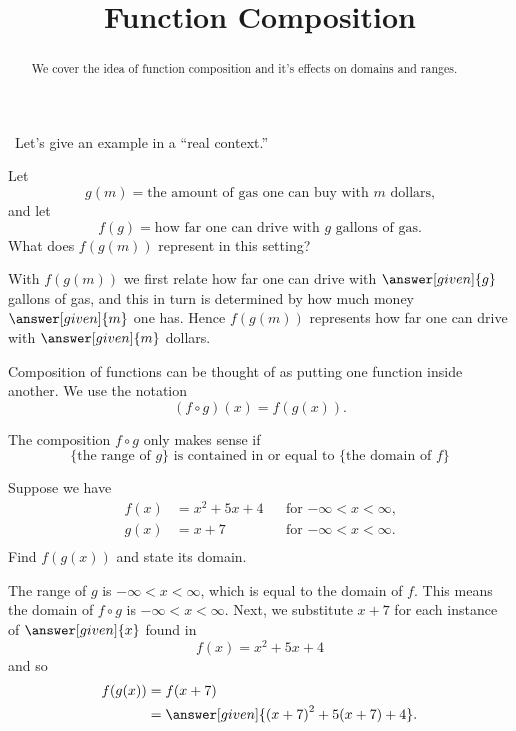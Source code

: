 \documentclass{ximera}
\title{Function Composition}
\begin{document}
\begin{abstract}
    We cover the idea of function composition and it's effects on domains and ranges.
\end{abstract}
\maketitle

\
Let's give an example in a ``real context.''
 
\begin{example}
    Let
    \[
        g(m) = \text{the amount of gas one can buy with $m$ dollars,}
    \]
    and let
    \[
        f(g) = \text{how far one can drive with $g$ gallons of gas.}
    \]
    What does $f(g(m))$ represent in this setting?
    \begin{explanation}
        With $f(g(m))$ we first relate how far one can drive with
        $\answer[given]{g}$ gallons of gas, and this in turn is determined
        by how much money $\answer[given]{m}$ one has. Hence $f(g(m))$ represents how far
        one can drive with $\answer[given]{m}$ dollars.
    \end{explanation}
\end{example}
 
Composition of functions can be thought of as putting one function
inside another.  We use the notation
\[
    (f\circ g)(x) = f(g(x)).
\]
\begin{warning}
    The composition $f\circ g$ only makes sense if
    \[
        \{\text{the range of $g$}\}
        \text{ is contained in or equal to }
        \{\text{the domain of $f$}\}
    \]
\end{warning}
 
\begin{example}
    Suppose we have
    \begin{align*}
        f(x)&={{x}^{2}}+5x+4    &&\text{for $-\infty< x< \infty$,}\\
        g(x)&= x+7              &&\text{for $-\infty< x< \infty$.}\\
    \end{align*}
    Find $f(g(x))$ and state its domain.
    \begin{explanation}
        The range of $g$ is $-\infty< x< \infty$, which is equal to the
        domain of $f$. This means the domain of $f\circ g$ is $-\infty< x<
        \infty$. Next, we substitute $x+7$ for each instance of $\answer[given]{x}$ found
        in
        \[
            f(x)={{x}^{2}}+5x+4
        \]
        and so
        \begin{align*}
            f(g(x)) &=f(x+7)\\
                    &=\answer[given]{{{(x+7)}^{2}}+5(x+7)+4}.
        \end{align*}
    \end{explanation}
\end{example}
 
\end{document}
